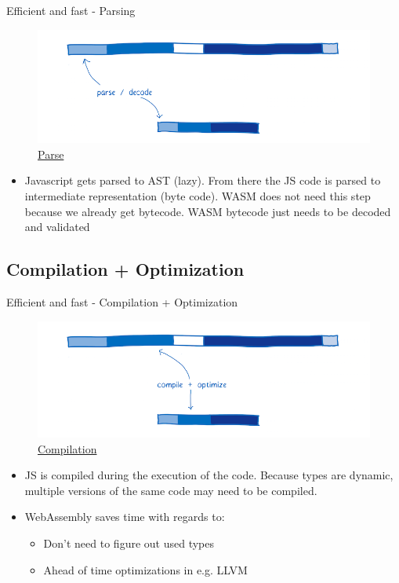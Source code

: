 \documentclass{beamer}
\begin{document}
\begin{frame}{Efficient and fast - Parsing}
    \begin{figure}
        \includegraphics[scale=0.2]{./images/pasedecode.png}
        \caption{\href{https://www.smashingmagazine.com/2017/05/abridged-cartoon-introduction-webassembly/}{Parse}}
    \end{figure}
    \begin{itemize}
        \item Javascript gets parsed to AST (lazy). From there the JS code is parsed to intermediate representation (byte code). WASM does not need this step because we already get bytecode. WASM bytecode just needs to be decoded and validated
    \end{itemize}
\end{frame}

\subsection{Compilation + Optimization}

\begin{frame}{Efficient and fast - Compilation + Optimization}
    \begin{figure}
        \includegraphics[scale=0.2]{./images/copyoptimize.png}
        \caption{\href{https://www.smashingmagazine.com/2017/05/abridged-cartoon-introduction-webassembly/}{Compilation}}
    \end{figure}
    \begin{itemize}
        \item JS is compiled during the execution of the code. Because types are dynamic, multiple versions of the same code may need to be compiled.
        \item WebAssembly saves time with regards to:
              \begin{itemize}
                  \item Don't need to figure out used types
                  \item Ahead of time optimizations in e.g. LLVM
              \end{itemize}
    \end{itemize}
\end{frame}
\end{document}

